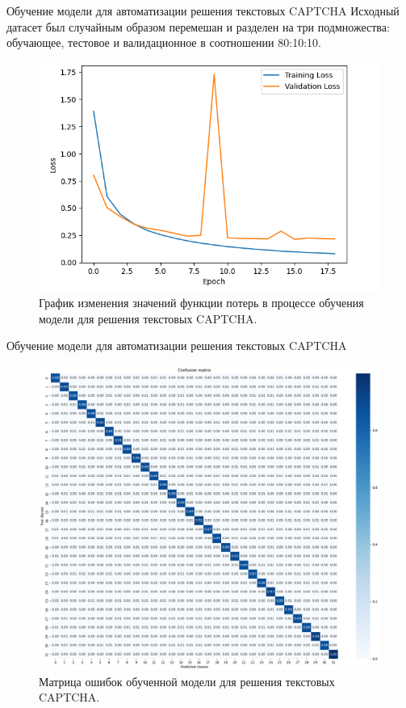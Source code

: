 \documentclass[12pt,a4paper,mathserif]{beamer}
\begin{document}
\begin{frame}{\small Обучение модели для автоматизации решения текстовых CAPTCHA}
    \setlength{\parindent}{0.5cm}
    Исходный датасет был случайным образом перемешан и разделен на три 
    подмножества: обучающее, тестовое и валидационное в соотношении 80:10:10.

    \begin{figure}[H]
        \centering
        \includegraphics[width=0.57\linewidth]{imgs/model-loss.png}
        \caption{\centering График изменения значений функции потерь в процессе обучения модели для решения текстовых CAPTCHA.}
    \end{figure}
\end{frame}

\begin{frame}{\small Обучение модели для автоматизации решения текстовых CAPTCHA}
    \begin{figure}
        \centering
        \includegraphics[width=0.63\linewidth]{imgs/confusion-matrix.png}
        \caption{\centering Матрица ошибок обученной модели для решения текстовых CAPTCHA.}
    \end{figure}
\end{frame}
\end{document}
